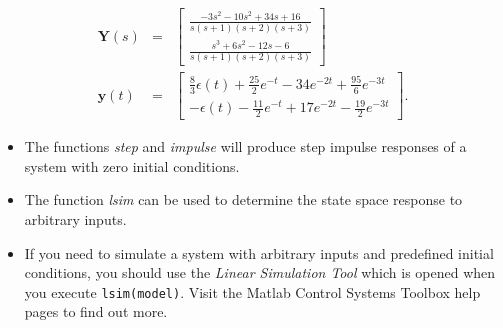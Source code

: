 \begin{slide}\label{slide:l4s17}
 \begin{eqnarray*}
\mathbf{Y}(s)&=& \left[\begin{array}{c}
  \frac{-3s^2-10s^2+34s+16}{s(s+1)(s+2)(s+3)} \\
  \frac{s^3+6s^2-12s-6}{s(s+1)(s+2)(s+3)}
\end{array}\right]\\
\mathbf{y}(t)&=& \left[\begin{array}{c}
  \frac{8}{3}\epsilon(t)+\frac{25}{2}e^{-t}-34e^{-2t}+\frac{95}{6}e^{-3t} \\
   -\epsilon(t)-\frac{11}{2}e^{-t}+17e^{-2t}-\frac{19}{2}e^{-3t}
\end{array}\right].
\end{eqnarray*}
\end{slide}

\begin{slide}
\begin{itemize}
	\item The functions \emph{step} and \emph{impulse} will produce step impulse responses of a system with zero initial conditions.
	\item The function \emph{lsim} can be used to determine the state space response to arbitrary inputs.
	\item If you need to simulate a system with arbitrary inputs and predefined initial conditions, you should use the \emph{Linear Simulation Tool} which is opened when you execute \texttt{lsim(model)}.
	Visit the Matlab Control Systems Toolbox help pages to find out more.
\end{itemize}
\end{slide}


